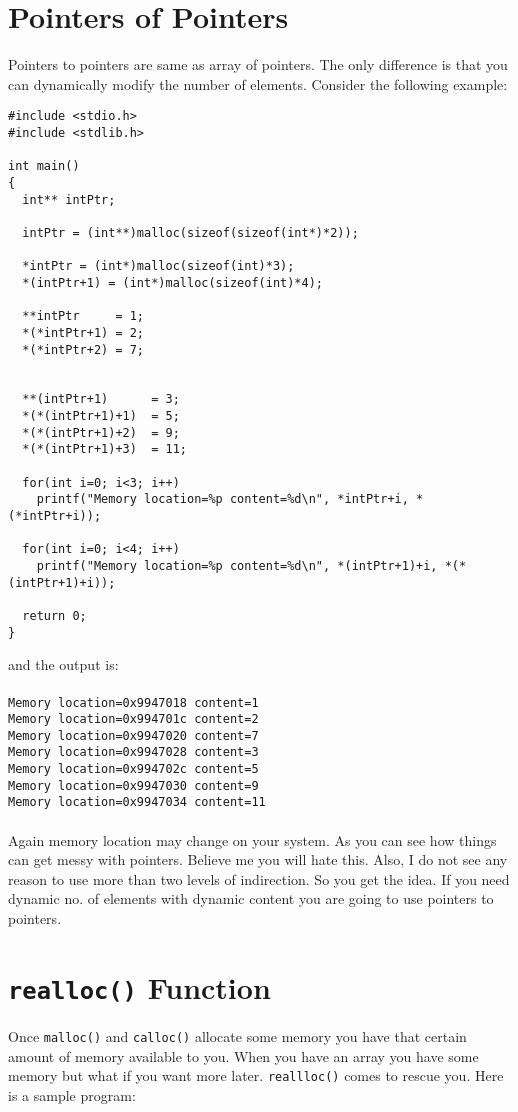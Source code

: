 \section{Pointers of Pointers}
Pointers to pointers are same as array of pointers. The only difference is that
you can dynamically modify the number of elements. Consider the following
example:

\begin{verbatim}
#include <stdio.h>
#include <stdlib.h>

int main()
{
  int** intPtr;

  intPtr = (int**)malloc(sizeof(sizeof(int*)*2));

  *intPtr = (int*)malloc(sizeof(int)*3);
  *(intPtr+1) = (int*)malloc(sizeof(int)*4);

  **intPtr     = 1;
  *(*intPtr+1) = 2;
  *(*intPtr+2) = 7;


  **(intPtr+1)      = 3;
  *(*(intPtr+1)+1)  = 5;
  *(*(intPtr+1)+2)  = 9;
  *(*(intPtr+1)+3)  = 11;

  for(int i=0; i<3; i++)
    printf("Memory location=%p content=%d\n", *intPtr+i, *(*intPtr+i));

  for(int i=0; i<4; i++)
    printf("Memory location=%p content=%d\n", *(intPtr+1)+i, *(*(intPtr+1)+i));

  return 0;
}
\end{verbatim}
and the output is:
\\\\\texttt{Memory location=0x9947018 content=1\\
Memory location=0x994701c content=2\\
Memory location=0x9947020 content=7\\
Memory location=0x9947028 content=3\\
Memory location=0x994702c content=5\\
Memory location=0x9947030 content=9\\
Memory location=0x9947034 content=11\\\\}
Again memory location may change on your system. As you can see how things can
get messy with pointers. Believe me you will hate this. Also, I do not see any
reason to use more than two levels of indirection. So you get the idea. If you
need dynamic no. of elements with dynamic content you are going to use pointers
to pointers.

\section{\texttt{realloc()} Function}
Once \texttt{malloc()} and \texttt{calloc()} allocate some memory you have that
certain amount of memory available to you. When you have an array you have some
memory but what if you want more later. \texttt{reallloc()} comes to rescue
you. Here is a sample program:

